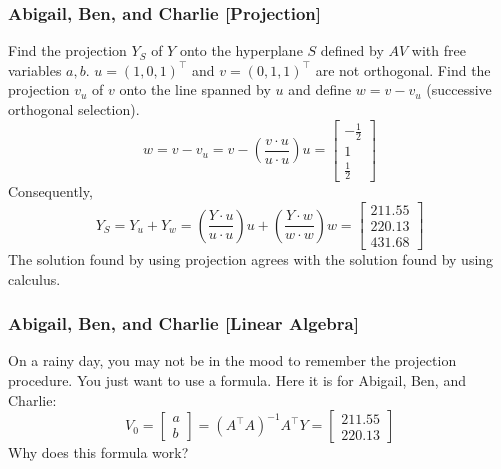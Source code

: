 \documentclass[xcolor=dvipsnames]{beamer}
\begin{document}
\begin{frame}
  \frametitle{Abigail, Ben, and Charlie [Projection]}
  Find the projection $Y_{S}$ of $Y$ onto the hyperplane $S$ defined
  by $AV$ with free variables $a,b$. $u=(1,0,1)^{\intercal}$ and
  $v=(0,1,1)^{\intercal}$ are not orthogonal. Find the projection
  $v_{u}$ of $v$ onto the line spanned by $u$ and define $w=v-v_{u}$
  (successive orthogonal selection).
  \begin{equation}
    \label{eq:ierishie}
    w=v-v_{u}=v-\left(\frac{v\cdot{}u}{u\cdot{}u}\right)u=\left[
      \begin{array}{c}
        -\frac{1}{2} \\
        1 \\
        \frac{1}{2}
      \end{array}\right]
  \end{equation}
  Consequently,
  \begin{equation}
    \label{eq:dieshahz}
    Y_{S}=Y_{u}+Y_{w}=\left(\frac{Y\cdot{}u}{u\cdot{}u}\right)u+\left(\frac{Y\cdot{}w}{w\cdot{}w}\right)w=\left[
      \begin{array}{c}
        211.55 \\
        220.13 \\
        431.68
      \end{array}\right]
  \end{equation}
The solution found by using projection agrees with the solution found by using calculus.
\end{frame}

\begin{frame}
  \frametitle{Abigail, Ben, and Charlie [Linear Algebra]}
  On a rainy day, you may not be in the mood to remember the
  projection procedure. You just want to use a formula. Here it is for
  Abigail, Ben, and Charlie:
  \begin{equation}
    \label{eq:zeifaidu}
    V_{0}=\left[
      \begin{array}{c}
        a \\
        b
      \end{array}\right]=(A^{\intercal}A)^{-1}A^{\intercal}Y=\left[
      \begin{array}{c}
        211.55 \\
        220.13
      \end{array}\right]
  \end{equation}
Why does this formula work?
\end{frame}
\end{document}

